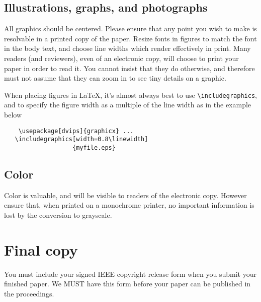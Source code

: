 \message{ !name(egpaper_for_review.tex)}\documentclass[10pt,twocolumn,letterpaper]{article}
\begin{document}
\subsection{Illustrations, graphs, and photographs}

All graphics should be centered.  Please ensure that any point you
wish to make is resolvable in a printed copy of the paper.  Resize
fonts in figures to match the font in the body text, and choose line
widths which render effectively in print.  Many readers (and
reviewers), even of an electronic copy, will choose to print your
paper in order to read it.  You cannot insist that they do otherwise,
and therefore must not assume that they can zoom in to see tiny
details on a graphic.

When placing figures in \LaTeX, it's almost always best to use
\verb+\includegraphics+, and to specify the figure width as a multiple
of the line width as in the example below {\small\begin{verbatim}
    \usepackage[dvips]{graphicx} ...
   \includegraphics[width=0.8\linewidth]
                   {myfile.eps}
\end{verbatim}
}


\subsection{Color}

Color is valuable, and will be visible to readers of the electronic
copy.  However ensure that, when printed on a monochrome printer, no
important information is lost by the conversion to grayscale.

\section{Final copy}

You must include your signed IEEE copyright release form when you
submit your finished paper. We MUST have this form before your paper
can be published in the proceedings.


{\small   }


\end{document}
